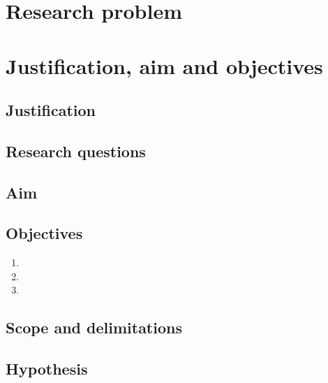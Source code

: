 \documentclass[11pt,a4paper]{article}
\begin{document}
\section{Research problem}

\section{Justification, aim and objectives}
\subsection{Justification}
\subsection{Research questions}
\subsection{Aim}
\subsection{Objectives}
\begin{enumerate}
  \item
  \item
  \item
\end{enumerate}
\subsection{Scope and delimitations}
\subsection{Hypothesis}
\end{document}
